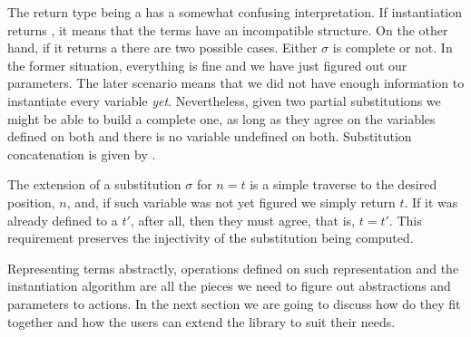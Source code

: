 The return type being a  has a somewhat confusing interpretation. If instantiation returns , it means that the terms have an incompatible structure. On the other hand, if it returns a  there are two possible cases. Either $\sigma$ is complete or not. In the former situation, everything is fine and we have just figured out our parameters. The later scenario means that we did not have enough information to instantiate every variable \emph{yet}. Nevertheless, given two partial substitutions we might be able to build a complete one, as long as they agree on the variables defined on both and there is no variable undefined on both. Substitution concatenation is given by .


The extension of a substitution $\sigma$ for $n = t$ is a simple traverse to the desired position, $n$, and, if such variable was not yet figured we simply return $t$. If it was already defined to a $t'$, after all, then they must agree, that is, $t = t'$. This requirement preserves the injectivity of
the substitution being computed. 


Representing terms abstractly, operations defined on such representation and
the instantiation algorithm are all the pieces we need to figure out abstractions and parameters to actions. In the next section we are going to
discuss how do they fit together and how the users can extend the library
to suit their needs.
 

